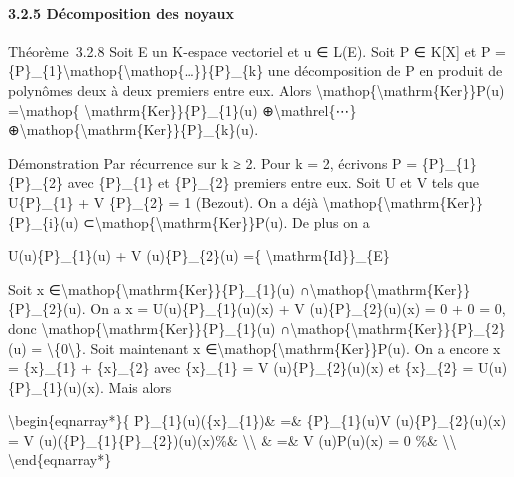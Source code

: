 \documentclass[]{article}
\begin{document}
\paragraph{3.2.5 Décomposition des noyaux}

Théorème~3.2.8 Soit E un K-espace vectoriel et u ∈ L(E). Soit P ∈
K{[}X{]} et P =
\{P\}\_\{1\}\textbackslash{}mathop\{\textbackslash{}mathop\{\ldots{}\}\}\{P\}\_\{k\}
une décomposition de P en produit de polynômes deux à deux premiers
entre eux. Alors
\textbackslash{}mathop\{\textbackslash{}mathrm\{Ker\}\}P(u)
=\textbackslash{}mathop\{ \textbackslash{}mathrm\{Ker\}\}\{P\}\_\{1\}(u)
⊕\textbackslash{}mathrel\{⋯\}
⊕\textbackslash{}mathop\{\textbackslash{}mathrm\{Ker\}\}\{P\}\_\{k\}(u).

Démonstration Par récurrence sur k ≥ 2. Pour k = 2, écrivons P =
\{P\}\_\{1\}\{P\}\_\{2\} avec \{P\}\_\{1\} et \{P\}\_\{2\} premiers
entre eux. Soit U et V tels que U\{P\}\_\{1\} + V \{P\}\_\{2\} = 1
(Bezout). On a déjà
\textbackslash{}mathop\{\textbackslash{}mathrm\{Ker\}\}\{P\}\_\{i\}(u)
⊂\textbackslash{}mathop\{\textbackslash{}mathrm\{Ker\}\}P(u). De plus on
a

U(u)\{P\}\_\{1\}(u) + V (u)\{P\}\_\{2\}(u) =\{
\textbackslash{}mathrm\{Id\}\}\_\{E\}

Soit x
∈\textbackslash{}mathop\{\textbackslash{}mathrm\{Ker\}\}\{P\}\_\{1\}(u)
∩\textbackslash{}mathop\{\textbackslash{}mathrm\{Ker\}\}\{P\}\_\{2\}(u).
On a x = U(u)\{P\}\_\{1\}(u)(x) + V (u)\{P\}\_\{2\}(u)(x) = 0 + 0 = 0,
donc
\textbackslash{}mathop\{\textbackslash{}mathrm\{Ker\}\}\{P\}\_\{1\}(u)
∩\textbackslash{}mathop\{\textbackslash{}mathrm\{Ker\}\}\{P\}\_\{2\}(u)
= \textbackslash{}\{0\textbackslash{}\}. Soit maintenant x
∈\textbackslash{}mathop\{\textbackslash{}mathrm\{Ker\}\}P(u). On a
encore x = \{x\}\_\{1\} + \{x\}\_\{2\} avec \{x\}\_\{1\} = V
(u)\{P\}\_\{2\}(u)(x) et \{x\}\_\{2\} = U(u)\{P\}\_\{1\}(u)(x). Mais
alors

\textbackslash{}begin\{eqnarray*\}\{ P\}\_\{1\}(u)(\{x\}\_\{1\})\& =\&
\{P\}\_\{1\}(u)V (u)\{P\}\_\{2\}(u)(x) = V
(u)(\{P\}\_\{1\}\{P\}\_\{2\})(u)(x)\%\& \textbackslash{}\textbackslash{}
\& =\& V (u)P(u)(x) = 0 \%\& \textbackslash{}\textbackslash{}
\textbackslash{}end\{eqnarray*\}
\end{document}
